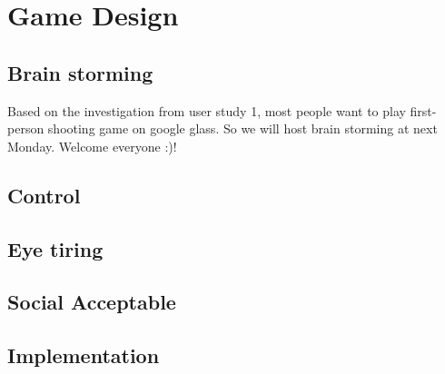 \section{Game Design}

\subsection{Brain storming}
Based on the investigation from user study 1, most people want to play first-person shooting game on google glass. So we will host brain storming at next Monday. Welcome everyone :)!

\subsection{Control}

\subsection{Eye tiring}

\subsection{Social Acceptable}

\subsection{Implementation}

